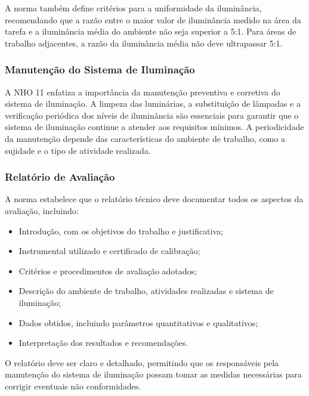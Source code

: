 A norma também define critérios para a uniformidade da iluminância, recomendando que a razão entre o maior valor de iluminância medido na área da tarefa e a iluminância média do ambiente não seja superior a 5:1. Para áreas de trabalho adjacentes, a razão da iluminância média não deve ultrapassar 5:1.

\subsubsection{Manutenção do Sistema de Iluminação}

A \gls{NHO} 11 enfatiza a importância da manutenção preventiva e corretiva do sistema de iluminação. A limpeza das luminárias, a substituição de lâmpadas e a verificação periódica dos níveis de iluminância são essenciais para garantir que o sistema de iluminação continue a atender aos requisitos mínimos. A periodicidade da manutenção depende das características do ambiente de trabalho, como a sujidade e o tipo de atividade realizada.

\subsubsection{Relatório de Avaliação}

A norma estabelece que o relatório técnico deve documentar todos os aspectos da avaliação, incluindo:

\begin{itemize}
    \item Introdução, com os objetivos do trabalho e justificativa;
    \item Instrumental utilizado e certificado de calibração;
    \item Critérios e procedimentos de avaliação adotados;
    \item Descrição do ambiente de trabalho, atividades realizadas e sistema de iluminação;
    \item Dados obtidos, incluindo parâmetros quantitativos e qualitativos;
    \item Interpretação dos resultados e recomendações.
\end{itemize}

O relatório deve ser claro e detalhado, permitindo que os responsáveis pela manutenção do sistema de iluminação possam tomar as medidas necessárias para corrigir eventuais não conformidades.



